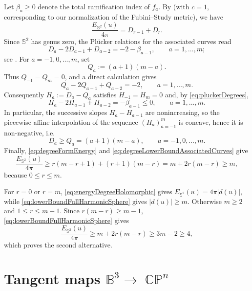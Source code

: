 \documentclass[11pt]{article}
\theoremstyle{plain}
\numberwithin{equation}{section}
\theoremstyle{definition}
\let\oldendproof\endproof
\renewenvironment{proof}[1][\proofname]{%
\oldproof[\upshape \bfseries #1]%
}{\oldendproof}
\def \mb{\mathbb}
\DeclareMathOperator{\CP}{\mathbb{CP}}
\begin{document}
\begin{proof}[Proof of Theorem \ref{thm:harmonicSphereDichotomyCPn}]
Let $\beta_a\geq0$ denote the total ramification index of $f_a$.  By
\cite[Proposition~7.1]{EellsWood1983}  (with $c=1$, corresponding to our normalization of the
Fubini--Study metric), we have
\begin{equation}
    \label{eq:degreeFormEnergy}
    \frac{E_{\mb S^2}(u)}{4\pi}=D_{r-1}+D_r.
\end{equation}
Since $\mb S^2$ has genus zero, the Pl\"ucker relations for the associated
curves read
\begin{equation}
    \label{eq:pluckerDegrees}
    D_a-2D_{a-1}+D_{a-2}=-2-\beta_{a-1},
    \qquad a=1,\ldots,m;
\end{equation}
see \cite[equation~(7.1)]{EellsWood1983}. For $a=-1,0,\ldots,m$, set
\[
    Q_a:=(a+1)(m-a).
\]
Thus $Q_{-1}=Q_m=0$, and a direct calculation gives
\[
    Q_a-2Q_{a-1}+Q_{a-2}=-2,
    \qquad a=1,\ldots,m.
\]
Consequently $H_a:=D_a-Q_a$ satisfies $H_{-1}=H_m=0$ and, by
\eqref{eq:pluckerDegrees},
\[
    H_a-2H_{a-1}+H_{a-2}=-\beta_{a-1}\leq0,
    \qquad a=1,\ldots,m.
\]
In particular, the successive slopes $H_a-H_{a-1}$ are nonincreasing, so
the piecewise-affine interpolation of the sequence $(H_a)_{a=-1}^m$ is
concave, hence it is non-negative, i.e.\
\begin{equation}
    \label{eq:degreeLowerBoundAssociatedCurves}
    D_a\geq Q_a=(a+1)(m-a),
    \qquad a=-1,0,\ldots,m.
\end{equation}
Finally, \eqref{eq:degreeFormEnergy} and
\eqref{eq:degreeLowerBoundAssociatedCurves} give
\begin{equation}
    \label{eq:lowerBoundFullHarmonicSphere}
    \frac{E_{\mb S^2}(u)}{4\pi}
    \geq r(m-r+1)+(r+1)(m-r)
    =m+2r(m-r)\geq m,
\end{equation}
because $0\leq r\leq m$.

For $r=0$ or $r=m$, \eqref{eq:energyDegreeHolomorphic} gives
$E_{\mb S^2}(u)=4\pi|d(u)|$, while
\eqref{eq:lowerBoundFullHarmonicSphere} gives $|d(u)|\geq m$.  Otherwise
$m\geq2$ and $1\leq r\leq m-1$.  Since
$r(m-r)\geq m-1$, \eqref{eq:lowerBoundFullHarmonicSphere} gives
\[
    \frac{E_{\mb S^2}(u)}{4\pi}
    \geq m+2r(m-r)\geq3m-2\geq4,
\]
which proves the second alternative.
\end{proof}

\section{Tangent maps \texorpdfstring{$\mb B^3\to \CP^n$}{B3 to CPn}}\label{sec:B3CPn}
\end{document}
